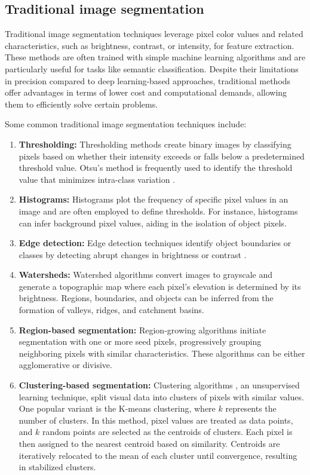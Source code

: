 \subsection{Traditional image segmentation}
Traditional image segmentation techniques leverage pixel color values and related characteristics, such as brightness, contrast, or intensity, for feature extraction. These methods are often trained with simple machine learning algorithms and are particularly useful for tasks like semantic classification. Despite their limitations in precision compared to deep learning-based approaches, traditional methods offer advantages in terms of lower cost and computational demands, allowing them to efficiently solve certain problems.

Some common traditional image segmentation techniques include:
\begin{enumerate}
  \item \textbf{Thresholding:} Thresholding methods create binary images by classifying pixels based on whether
  their intensity exceeds or falls below a predetermined threshold value. Otsu's method is frequently used to identify the threshold value that minimizes intra-class variation \cite{otsu1979}.
  \item \textbf{Histograms:} Histograms plot the frequency of specific pixel values in an image and are often employed to define thresholds. For instance, histograms can infer background pixel values, aiding in the isolation of object pixels.
  \item \textbf{Edge detection:} Edge detection techniques identify object boundaries or classes by detecting abrupt changes in brightness or contrast \cite{Edgedet1986}.
  \item \textbf{Watersheds:} Watershed algorithms \cite{Watershed1991} convert images to grayscale and generate a topographic map where each pixel's elevation is determined by its brightness. Regions, boundaries, and objects can be inferred from the formation of valleys, ridges, and catchment basins.
  \item \textbf{Region-based segmentation:} Region-growing algorithms \cite{RCNN2016} initiate segmentation with one or more seed pixels, progressively grouping neighboring pixels with similar characteristics. These algorithms can be either agglomerative or divisive.
  \item \textbf{Clustering-based segmentation:} Clustering algorithms \cite{ClusteringSeg1979}, an unsupervised
  learning technique, split visual data into clusters of pixels with similar values. One popular variant is the K-means
  clustering, where $k$ represents the number of clusters. In this method, pixel values are treated as data points, and $k$ random points are selected as the centroids of clusters. Each pixel is then assigned to the nearest centroid based on similarity. Centroids are iteratively relocated to the mean of each cluster until convergence, resulting in stabilized clusters.
\end{enumerate}

